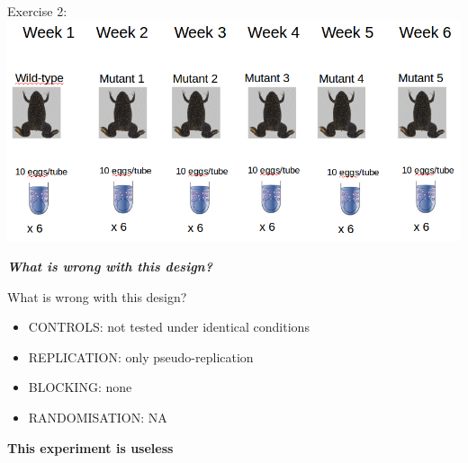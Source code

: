 \documentclass{beamer}
\begin{document}
\begin{frame}{Exercise 2:}
 \includegraphics[width=\textwidth]{Figures/expdes2}
  
 \emph{\textbf{What is wrong with this design?}}
\end{frame}

\begin{frame}{What is wrong with this design?}
 \begin{alertblock}{}
 \begin{itemize}
  \item CONTROLS: not tested under identical conditions
  \item REPLICATION: only pseudo-replication
  \item BLOCKING: none
  \item RANDOMISATION: NA
 \end{itemize}
 \end{alertblock}
 
 \pause
 
 \textbf{This experiment is useless}

\end{frame}
\end{document}
